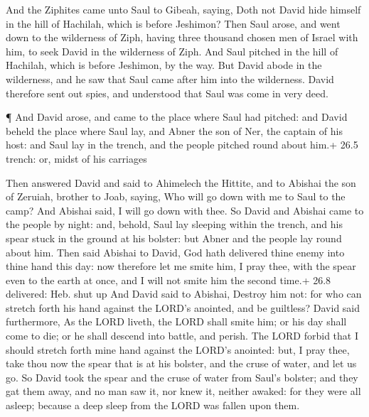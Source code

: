  And the Ziphites came unto Saul to Gibeah, saying, Doth not
David hide himself in the hill of Hachilah, which is before Jeshimon?
 Then Saul arose, and went down to the wilderness of Ziph,
having three thousand chosen men of Israel with him, to seek David in
the wilderness of Ziph.  And Saul pitched in the hill of
Hachilah, which is before Jeshimon, by the way. But David abode in the
wilderness, and he saw that Saul came after him into the wilderness.
 David therefore sent out spies, and understood that Saul
was come in very deed.

 ¶ And David arose, and came to the place where Saul had
pitched: and David beheld the place where Saul lay, and Abner the son of
Ner, the captain of his host: and Saul lay in the trench, and the people
pitched round about him.+ 26.5 trench: or, midst of his carriages

 Then answered David and said to Ahimelech the Hittite, and
to Abishai the son of Zeruiah, brother to Joab, saying, Who will go down
with me to Saul to the camp? And Abishai said, I will go down with thee.
 So David and Abishai came to the people by night: and,
behold, Saul lay sleeping within the trench, and his spear stuck in the
ground at his bolster: but Abner and the people lay round about him.
 Then said Abishai to David, God hath delivered thine enemy
into thine hand this day: now therefore let me smite him, I pray thee,
with the spear even to the earth at once, and I will not smite him the
second time.+ 26.8 delivered: Heb. shut up  And David said
to Abishai, Destroy him not: for who can stretch forth his hand against
the LORD's anointed, and be guiltless?  David said
furthermore, As the LORD liveth, the LORD shall smite him; or his day
shall come to die; or he shall descend into battle, and perish.
 The LORD forbid that I should stretch forth mine hand
against the LORD's anointed: but, I pray thee, take thou now the spear
that is at his bolster, and the cruse of water, and let us go.
 So David took the spear and the cruse of water from Saul's
bolster; and they gat them away, and no man saw it, nor knew it, neither
awaked: for they were all asleep; because a deep sleep from the LORD was
fallen upon them.

